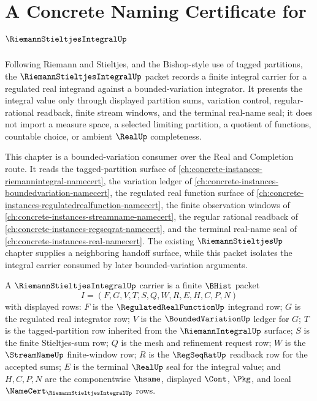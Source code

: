 \chapter{A Concrete Naming Certificate for $\RiemannStieltjesIntegralUp$}
\label{ch:concrete-instances-riemann-stieltjes-integral-namecert}

Following Riemann and Stieltjes, and the Bishop-style use of tagged partitions, the $\RiemannStieltjesIntegralUp$ packet records a finite integral carrier for a regulated real integrand against a bounded-variation integrator. It presents the integral value only through displayed partition sums, variation control, regular-rational readback, finite stream windows, and the terminal real-name seal; it does not import a measure space, a selected limiting partition, a quotient of functions, countable choice, or ambient $\RealUp$ completeness.

This chapter is a bounded-variation consumer over the Real and Completion route. It reads the tagged-partition surface of \autoref{ch:concrete-instances-riemannintegral-namecert}, the variation ledger of \autoref{ch:concrete-instances-boundedvariation-namecert}, the regulated real function surface of \autoref{ch:concrete-instances-regulatedrealfunction-namecert}, the finite observation windows of \autoref{ch:concrete-instances-streamname-namecert}, the regular rational readback of \autoref{ch:concrete-instances-regseqrat-namecert}, and the terminal real-name seal of \autoref{ch:concrete-instances-real-namecert}. The existing $\RiemannStieltjesUp$ chapter supplies a neighboring handoff surface, while this packet isolates the integral carrier consumed by later bounded-variation arguments.

\begin{definition}
\label{def:riemann-stieltjes-integral-carrier}
A $\RiemannStieltjesIntegralUp$ carrier is a finite $\BHist$ packet
$$
I=(F,G,V,T,S,Q,W,R,E,H,C,P,N)
$$
with displayed rows: $F$ is the $\RegulatedRealFunctionUp$ integrand row; $G$ is the regulated real integrator row; $V$ is the $\BoundedVariationUp$ ledger for $G$; $T$ is the tagged-partition row inherited from the $\RiemannIntegralUp$ surface; $S$ is the finite Stieltjes-sum row; $Q$ is the mesh and refinement request row; $W$ is the $\StreamNameUp$ finite-window row; $R$ is the $\RegSeqRatUp$ readback row for the accepted sums; $E$ is the terminal $\RealUp$ seal for the integral value; and $H,C,P,N$ are the componentwise $\hsame$, displayed $\Cont$, $\Pkg$, and local $\NameCert_{\RiemannStieltjesIntegralUp}$ rows.
\end{definition}

